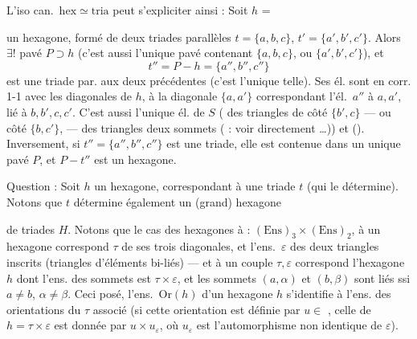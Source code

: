 \documentclass[11pt,a4paper]{article}
\begin{document}
L'iso can.\ $\mathrm{hex} \simeq \mathrm{tria}$ peut s'expliciter ainsi : Soit $h$ =


un hexagone,  formé de deux triades parallèles $t = \{a,b,c\}$, $t' = \{a',b',c'\}$. Alors $\exists !$ pavé $P \supset h$ (c'est aussi l'unique pavé contenant $\{a,b,c\}$, ou $\{a',b',c'\}$), et
\[
  t'' = P - h = \{a'', b'', c''\}
\]
est une triade par. aux deux précédentes (c'est l'unique telle). Ses él. sont en corr. 1-1 avec les diagonales de $h$, à la diagonale $\{a,a'\}$ correspondant l'él.\ $a''$     à $a, a'$,  lié à $b, b', c, c'$. C'est \add{(\ill{})} aussi l'unique él. de $S$  ( des triangles de côté $\{b',c\}$ — ou côté $\{b,c'\}$, — des triangles  deux sommets   ( : voir directement …)) et \struck{\ill{} \ill{} \ill{}}   (). Inversement, si $t'' = \{a'',b'',c''\}$ est une triade, elle est contenue dans un unique pavé $P$, et $P - t''$ est un hexagone.

Question : Soit $h$ un  hexagone, correspondant à une triade $t$ (qui le détermine). Notons que $t$ détermine également un (grand) hexagone


de triades $H$. Notons que le cas des hexagones   à : $(\mathrm{Ens})_3 \times (\mathrm{Ens})_2$, à un hexagone correspond   $\tau$ de ses trois diagonales, et l'ens.\ $\varepsilon$ des deux triangles inscrits (triangles d'éléments bi-liés) — et à un couple $\tau, \varepsilon$ correspond l'hexagone $h$ dont l'ens. des sommets est $\tau \times \varepsilon$, et les sommets $(a,\alpha)$ et $(b,\beta)$ sont liés ssi $a \neq b$, $\alpha \neq \beta$. Ceci posé, l'ens.\ $\mathrm{Or}(h)$ d'un hexagone $h$ s'identifie à l'ens. des orientations du $\tau$ associé (si cette orientation est définie par $u \in$ \ill{}, celle de $h = \tau \times \varepsilon$ est donnée par $u \times u_\varepsilon$, où $u_\varepsilon$ est l'automorphisme non identique de $\varepsilon$). 
\end{document}
